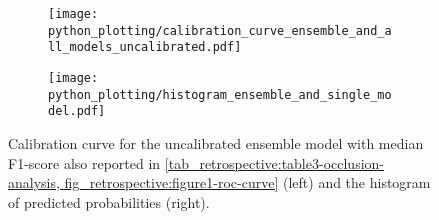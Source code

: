 \begin{figure}
    \begin{subfigure}[c]{0.48\columnwidth}
        \centering
        \texttt{[image: python\_plotting/calibration\_curve\_ensemble\_and\_all\_models\_uncalibrated.pdf]}
    \end{subfigure}
    \begin{subfigure}[c]{0.48\columnwidth}
        \centering
        \texttt{[image: python\_plotting/histogram\_ensemble\_and\_single\_model.pdf]}
    \end{subfigure}
    \caption[Calibration curve for the uncalibrated stroke recognition model and empirical distribution of predicted probabilities.]{Calibration curve for the uncalibrated ensemble model with median F1-score also reported in \cref{tab_retrospective:table3-occlusion-analysis, fig_retrospective:figure1-roc-curve} (left) and the histogram of predicted probabilities (right).}
\end{figure}







